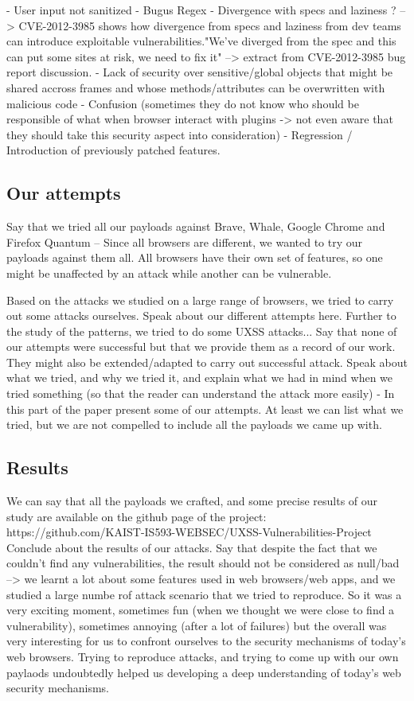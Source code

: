 \documentclass[journal]{IEEEtran}
\begin{document}
\medskip

- User input not sanitized
- Bugus Regex
- Divergence with specs and laziness ? --> CVE-2012-3985 shows how divergence from specs and laziness from dev teams can introduce exploitable vulnerabilities."We've diverged from the spec and this can put some sites at risk, we need to fix it" --> extract from CVE-2012-3985 bug report discussion.
- Lack of security over sensitive/global objects that might be shared accross frames and whose methods/attributes can be overwritten with malicious code
- Confusion (sometimes they do not know who should be responsible of what when browser interact with plugins -> not even aware that they should take this security aspect into consideration)
- Regression / Introduction of previously patched features.

\subsection{Our attempts}

Say that we tried all our payloads against Brave, Whale, Google Chrome and Firefox Quantum -- Since all browsers are different, we wanted to try our payloads against them all. All browsers have their own set of features, so one might be unaffected by an attack while another can be vulnerable.

Based on the attacks we studied on a large range of browsers, we tried to carry out some attacks ourselves.
Speak about our different attempts here.
Further to the study of the patterns, we tried to do some UXSS attacks...
Say that none of our attempts were successful but that we provide them as a record of our work. They might also be extended/adapted to carry out successful attack.
Speak about what we tried, and why we tried it, and explain what we had in mind when we tried something (so that the reader can understand the attack more easily)
- In this part of the paper present some of our attempts. At least we can list what we tried, but we are not compelled to include all the payloads we came up with.

\subsection{Results}

We can say that all the payloads we crafted, and some precise results of our study are available on the github page of the project: https://github.com/KAIST-IS593-WEBSEC/UXSS-Vulnerabilities-Project
Conclude about the results of our attacks. Say that despite the fact that we couldn't find any vulnerabilities, the result should not be considered as null/bad --> we learnt a lot about some features used in web browsers/web apps, and we studied a large numbe rof attack scenario that we tried to reproduce. So it was a very exciting moment, sometimes fun (when we thought we were close to find a vulnerability), sometimes annoying (after a lot of failures) but the overall was very interesting for us to confront ourselves to the security mechanisms of today's web browsers. Trying to reproduce attacks, and trying to come up with our own paylaods undoubtedly helped us developing a deep understanding of today's web security mechanisms.
\end{document}
